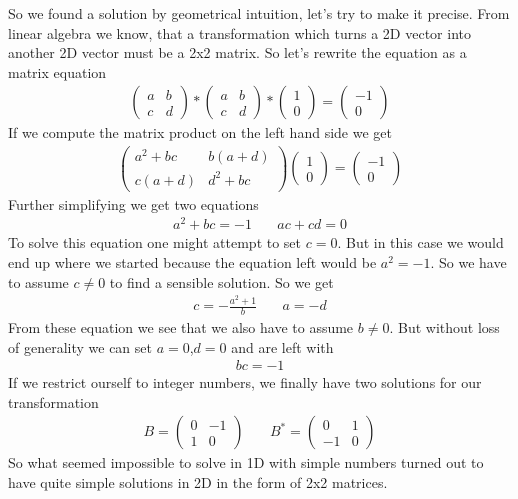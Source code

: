 So we found a solution by geometrical intuition, let's try to make it
precise. From linear algebra we know, that a transformation which turns
a 2D vector into another 2D vector must be a 2x2 matrix. So let's
rewrite the equation as a matrix equation 
\begin{align}
\begin{pmatrix} a & b \\ c & d \end{pmatrix} * \begin{pmatrix} a & b \\ c & d \end{pmatrix} * \begin{pmatrix} 1 \\ 0 \end{pmatrix} = \begin{pmatrix} -1 \\ 0 \end{pmatrix} 
\end{align} 
If we compute the matrix product on the left hand side we get 
\begin{align}
\begin{pmatrix} a^2 + bc & b (a+d) \\ c(a+d) & d^2 + bc \end{pmatrix} \begin{pmatrix} 1 \\ 0 \end{pmatrix} = \begin{pmatrix} -1 \\ 0 \end{pmatrix} 
\end{align} 
Further simplifying we get two equations 
\begin{align}
a^2+bc = -1 &\ & ac + cd = 0
\end{align} 
To solve this equation one might attempt to set $c=0$. But in this
case we would end up where we started because the equation left would be
$a^2=-1$. So we have to assume $c \neq 0$ to find a sensible
solution. So we get 
\begin{align}
c = -\frac{a^2+1}{b} &\ & a = -d
\end{align} 
From these equation we see that we also have to assume $b \neq 0$.
But without loss of generality we can set $a=0$,$d=0$ and are left
with 
\begin{align}
bc = -1
\end{align} 
If we restrict ourself to integer numbers, we finally have two
solutions for our transformation 
\begin{align}
B = \begin{pmatrix} 0 & -1 \\ 1 & 0 \end{pmatrix}  &\ & B^* = \begin{pmatrix} 0 & 1 \\ -1 & 0 \end{pmatrix}
\end{align} 
So what seemed impossible to solve in 1D with simple numbers turned
out to have quite simple solutions in 2D in the form of 2x2 matrices.

